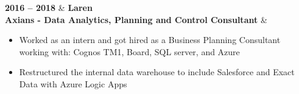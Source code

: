 \textbf{2016 – 2018} & \textbf{Laren} \\
\textbf{Axians - Data Analytics, Planning and Control Consultant} \faExternalLink & 
\begin{itemize}[leftmargin=0.5cm,itemsep=0pt,parsep=0pt]
\item Worked as an intern and got hired as a Business Planning Consultant working with: Cognos TM1, Board, SQL server, and Azure
\item Restructured the internal data warehouse to include Salesforce and Exact Data with Azure Logic Apps
\end{itemize} \\ 